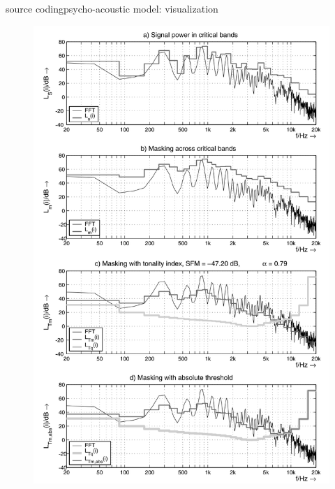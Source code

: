 \begin{frame}{source coding}{psycho-acoustic model: visualization}
\begin{figure}
					\includegraphics[scale=0.2]{Graph/psychomodeloutput}
			\end{figure}
	\end{frame}
	
